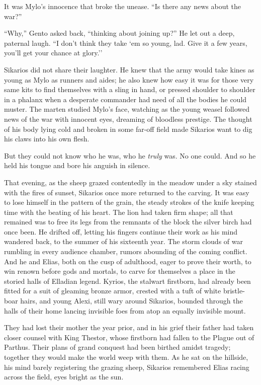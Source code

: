 It was Mylo's innocence that broke the unease. ``Is there any news about the war?''

``Why,'' Gento asked back, ``thinking about joining up?'' He let out a deep, paternal laugh. ``I don't think they take `em so young, lad. Give it a few years, you'll get your chance at glory.''

Sikarios did not share their laughter. He knew that the army would take kines as young as Mylo as runners and aides; he also knew how easy it was for those very same kits to find themselves with a sling in hand, or pressed shoulder to shoulder in a phalanx when a desperate commander had need of all the bodies he could muster. The marten studied Mylo's face, watching as the young weasel followed news of the war with innocent eyes, dreaming of bloodless prestige. The thought of his body lying cold and broken in some far-off field made Sikarios want to dig his claws into his own flesh.

But they could not know who he was, who he \emph{truly} was. No one could. And so he held his tongue and bore his anguish in silence.

\secdiv

\noindent That evening, as the sheep grazed contentedly in the meadow under a sky stained with the fires of sunset, Sikarios once more returned to the carving. It was easy to lose himself in the pattern of the grain, the steady strokes of the knife keeping time with the beating of his heart. The lion had taken firm shape; all that remained was to free its legs from the remnants of the block the silver birch had once been. He drifted off, letting his fingers continue their work as his mind wandered back, to the summer of his sixteenth year. The storm clouds of war rumbling in every audience chamber, rumors abounding of the coming conflict. And he and Elias, both on the cusp of adulthood, eager to prove their worth, to win renown before gods and mortals, to carve for themselves a place in the storied halls of Elladian legend. Kyrios, the stalwart firstborn, had already been fitted for a suit of gleaming bronze armor, crested with a tuft of white bristle-boar hairs, and young Alexi, still wary around Sikarios, bounded through the halls of their home lancing invisible foes from atop an equally invisible mount.

They had lost their mother the year prior, and in his grief their father had taken closer counsel with King Thestor, whose firstborn had fallen to the Plague out of Parthus. Their plans of grand conquest had been birthed amidst tragedy; together they would make the world weep with them. As he sat on the hillside, his mind barely registering the grazing sheep, Sikarios remembered Elias racing across the field, eyes bright as the sun.

